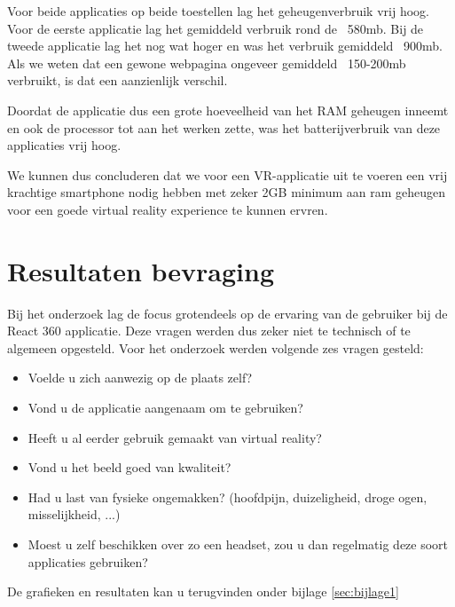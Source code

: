 Voor beide applicaties op beide toestellen lag het geheugenverbruik vrij hoog. Voor de eerste applicatie lag het gemiddeld verbruik rond de ~580mb. Bij de tweede applicatie lag het nog wat hoger en was het verbruik gemiddeld ~900mb.  Als we weten dat een gewone webpagina ongeveer gemiddeld ~150-200mb verbruikt, is dat een aanzienlijk verschil.

Doordat de applicatie dus een grote hoeveelheid van het RAM geheugen inneemt en ook de processor tot aan het werken zette, was het batterijverbruik van deze applicaties vrij hoog.

We kunnen dus concluderen dat we voor een VR-applicatie uit te voeren een vrij krachtige smartphone nodig hebben met zeker 2GB minimum aan ram geheugen voor een goede virtual reality experience te kunnen ervren.

\section{Resultaten bevraging}
\label{sec:resulaten-apps}
Bij het onderzoek lag de focus grotendeels op de ervaring van de gebruiker bij de React 360 applicatie. Deze vragen werden dus zeker niet te technisch of te algemeen opgesteld. Voor het onderzoek werden volgende zes vragen gesteld:

\begin{itemize}
	\item Voelde u zich aanwezig op de plaats zelf?
	\item Vond u de applicatie aangenaam om te gebruiken?
	\item Heeft u al eerder gebruik gemaakt van virtual reality?
	\item Vond u het beeld goed van kwaliteit?
	\item Had u last van fysieke ongemakken? (hoofdpijn, duizeligheid, droge ogen, misselijkheid, ...)
	\item Moest u zelf beschikken over zo een headset, zou u dan regelmatig deze soort applicaties gebruiken? 
\end{itemize}

De grafieken en resultaten kan u terugvinden onder bijlage \ref{sec:bijlage1}

